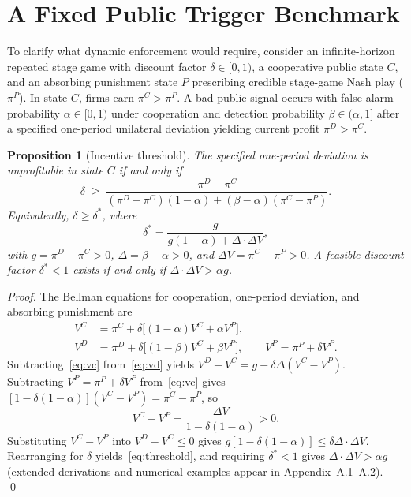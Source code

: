 \documentclass{article}
\newtheorem{proposition}{Proposition}
\begin{document}
\section{A Fixed Public Trigger Benchmark}

To clarify what dynamic enforcement would require, consider an infinite-horizon repeated stage game with discount factor $\delta\in[0,1)$, a cooperative public state $C$, and an absorbing punishment state $P$ prescribing credible stage-game Nash play ($\pi^P$). In state $C$, firms earn $\pi^C > \pi^P$. A bad public signal occurs with false-alarm probability $\alpha\in[0,1)$ under cooperation and detection probability $\beta\in(\alpha,1]$ after a specified one-period unilateral deviation yielding current profit $\pi^D > \pi^C$.

\begin{proposition}[Incentive threshold]\label{prop:threshold}
The specified one-period deviation is unprofitable in state $C$ if and only if
\begin{equation}\label{eq:threshold}
\delta \;\geq\;
\frac{\pi^D - \pi^C}
{(\pi^D-\pi^C)(1-\alpha) + (\beta-\alpha)(\pi^C-\pi^P)}.
\end{equation}
Equivalently, $\delta\geq\delta^*$, where
\[
\delta^* = \frac{g}{g(1-\alpha) + \Delta\cdot\Delta V},
\]
with $g=\pi^D-\pi^C>0$, $\Delta=\beta-\alpha>0$, and $\Delta V=\pi^C-\pi^P>0$. A feasible discount factor $\delta^*<1$ exists if and only if $\Delta\cdot\Delta V > \alpha g$.
\end{proposition}

\begin{proof}
The Bellman equations for cooperation, one-period deviation, and absorbing punishment are
\begin{align}
V^C &= \pi^C + \delta\bigl[(1-\alpha)V^C + \alpha V^P\bigr],
\label{eq:vc}\\
V^D &= \pi^D + \delta\bigl[(1-\beta)V^C + \beta V^P\bigr], \qquad
V^P = \pi^P + \delta V^P.
\label{eq:vd}
\end{align}
Subtracting~\eqref{eq:vc} from~\eqref{eq:vd} yields $V^D - V^C = g - \delta\Delta(V^C-V^P)$. Subtracting $V^P=\pi^P+\delta V^P$ from~\eqref{eq:vc} gives $[1-\delta(1-\alpha)](V^C-V^P)=\pi^C-\pi^P$, so
\[
V^C - V^P = \frac{\Delta V}{1-\delta(1-\alpha)} > 0.
\]
Substituting $V^C-V^P$ into $V^D-V^C\leq 0$ gives $g[1-\delta(1-\alpha)] \leq \delta\Delta\cdot\Delta V$. Rearranging for $\delta$ yields~\eqref{eq:threshold}, and requiring $\delta^*<1$ gives $\Delta\cdot\Delta V > \alpha g$ (extended derivations and numerical examples appear in Appendix~A.1--A.2). \qed
\end{proof}
\end{document}
